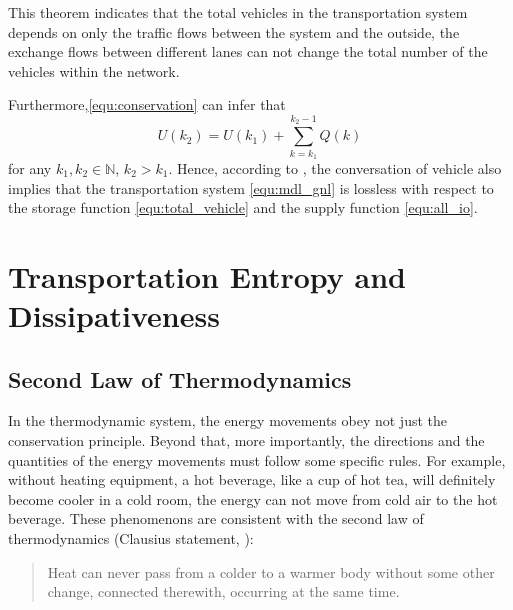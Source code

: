 \documentclass[preprint,authoryear,12pt]{elsarticle}
\begin{document}
This theorem indicates that the total vehicles in the transportation
system depends on only the traffic flows between the system and the
outside, the exchange flows between different lanes can not change
the total number of the vehicles within the network.

Furthermore,\eqref{equ:conservation} can infer that
\begin{equation}\label{equ:conservation_ex}
U(k_2) = U(k_1)+\sum_{k=k_1}^{k_2-1}Q(k)
\end{equation}
for any $k_1,k_2\in\mathbb{N}$, $k_2>k_1$. Hence, according to
\citep{willems_dissipative_1972-1}, the conversation of vehicle also
implies that the transportation system \eqref{equ:mdl_gnl} is
lossless with respect to the storage function
\eqref{equ:total_vehicle} and the supply function \eqref{equ:all_io}.


\section{Transportation Entropy and Dissipativeness}

\subsection{Second Law of Thermodynamics}

In the thermodynamic system, the energy movements obey not just the
conservation principle. Beyond that, more importantly, the directions
and the quantities of the energy movements must follow some specific
rules. For example, without heating equipment, a hot beverage, like a
cup of hot tea, will definitely become cooler in a cold room, the
energy can not move from cold air to the hot beverage. These
phenomenons are consistent with the second law of thermodynamics
(Clausius statement, \citet{clausius_mechanical_1867}):
\begin{quotation}
Heat can never pass from a colder to a warmer body without some other
change, connected therewith, occurring at the same time.
\end{quotation}
\end{document}

